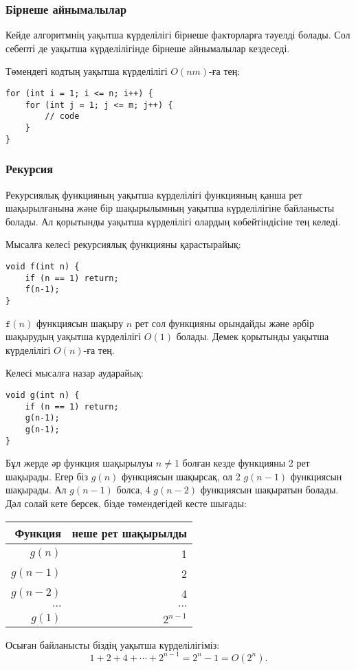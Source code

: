 \subsubsection*{Бірнеше айнымалылар}

Кейде алгоритмнің уақытша күрделілігі бірнеше факторларға тәуелді болады.
Сол себепті де уақытша күрделілігінде бірнеше айнымалылар кездеседі.

Төмендегі кодтың уақытша күрделілігі $O(nm)$-ға тең:

\begin{lstlisting}
for (int i = 1; i <= n; i++) {
    for (int j = 1; j <= m; j++) {
        // code
    }
}
\end{lstlisting}

\subsubsection*{Рекурсия}

Рекурсиялық функцияның уақытша күрделілігі функцияның 
қанша рет шақырылғанына және бір шақырылымның уақытша күрделілігіне 
байланысты болады. 
Ал қорытынды уақытша күрделілігі олардың көбейтіндісіне тең келеді.

Мысалға келесі рекурсиялық функцияны қарастырайық:
\begin{lstlisting}
void f(int n) {
    if (n == 1) return;
    f(n-1);
}
\end{lstlisting}
$\texttt{f}(n)$ функциясын шақыру $n$ рет сол функцияны орындайды
және әрбір шақырудың уақытша күрделілігі $O(1)$ болады. 
Демек қорытынды уақытша күрделілігі $O(n)$-ға тең.

Келесі мысалға назар аударайық:
\begin{lstlisting}
void g(int n) {
    if (n == 1) return;
    g(n-1);
    g(n-1);
}
\end{lstlisting}
Бұл жерде әр функция шақырылуы $n \neq 1$ болған кезде функцияны 2 рет шақырады.
Егер біз $g(n)$ функциясын шақырсақ, ол 2 $g(n-1)$ функциясын шақырады.
Ал $g(n-1)$ болса, 4 $g(n-2)$ функциясын шақыратын болады. 
Дәл солай кете берсек, бізде төмендегідей кесте шығады:

\begin{center}
\begin{tabular}{rr}
Функция & неше рет шақырылды \\
\hline
$g(n)$ & 1 \\
$g(n-1)$ & 2 \\
$g(n-2)$ & 4 \\
$\cdots$ & $\cdots$ \\
$g(1)$ & $2^{n-1}$ \\
\end{tabular}
\end{center}
Осыған байланысты біздің уақытша күрделілігіміз:
\[1+2+4+\cdots+2^{n-1} = 2^n-1 = O(2^n).\]

